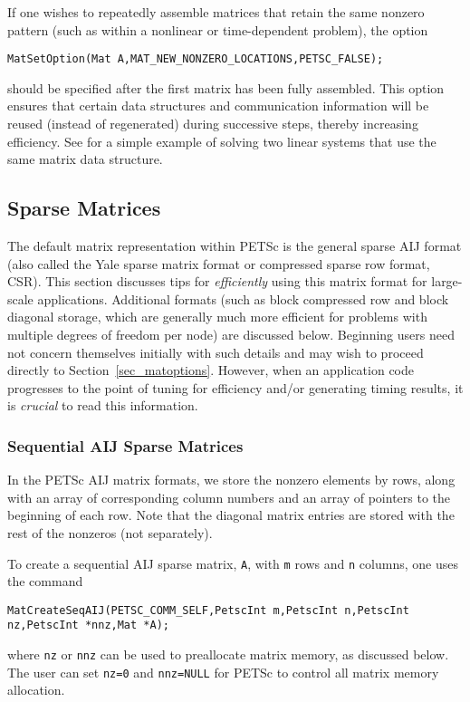 If one wishes to repeatedly assemble matrices that retain the same
nonzero pattern (such as within a nonlinear or time-dependent
problem), the option
\begin{lstlisting}
MatSetOption(Mat A,MAT_NEW_NONZERO_LOCATIONS,PETSC_FALSE);
\end{lstlisting} 
should be specified after the first matrix has been fully assembled.
This option ensures that certain data structures and communication
information will be reused (instead of regenerated) during successive
steps, thereby increasing efficiency.
See \href{http://www.mcs.anl.gov/petsc/petsc-current/src/ksp/ksp/examples/tutorials/ex5.c.html}{} for a simple example of
solving two linear systems that use the same matrix data structure.

\subsection{Sparse Matrices}
\label{sec_matsparse}

 
The default matrix representation within PETSc is the general sparse
AIJ format (also called the Yale sparse matrix format or compressed
sparse row format, CSR).  This section discusses tips for {\em
efficiently} using this matrix format for large-scale
applications. Additional formats (such as block compressed row and
block diagonal storage, which are generally much more efficient for
problems with multiple degrees of freedom per node) are discussed
below.  Beginning users need not concern themselves initially with
such details and may wish to proceed directly to
Section~\ref{sec_matoptions}.  However, when an application code
progresses to the point of tuning for efficiency and/or generating
timing results, it is {\em crucial} to read this information.

\subsubsection{Sequential AIJ Sparse Matrices}

In the PETSc AIJ matrix formats, we store the nonzero elements
by rows, along with an array of corresponding column numbers and
an array of pointers to the beginning of each row.  Note that the
diagonal matrix entries are stored with the rest of the nonzeros (not
separately).

To create a sequential AIJ sparse matrix, \lstinline{A},
with \lstinline{m} rows and \lstinline{n} columns,
one uses the command
\begin{lstlisting}
MatCreateSeqAIJ(PETSC_COMM_SELF,PetscInt m,PetscInt n,PetscInt nz,PetscInt *nnz,Mat *A);
\end{lstlisting}
where \lstinline{nz} or \lstinline{nnz} can be used to preallocate matrix memory,
as discussed below. The user can set \lstinline{nz=0} and \lstinline{nnz=NULL} for PETSc to control all matrix memory allocation.

